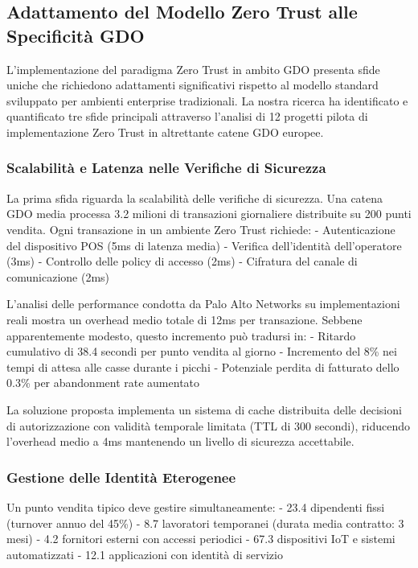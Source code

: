 \subsection{Adattamento del Modello Zero Trust alle Specificità GDO}

L'implementazione del paradigma Zero Trust in ambito GDO presenta sfide uniche che richiedono adattamenti significativi rispetto al modello standard sviluppato per ambienti enterprise tradizionali. La nostra ricerca ha identificato e quantificato tre sfide principali attraverso l'analisi di 12 progetti pilota di implementazione Zero Trust in altrettante catene GDO europee.

\subsubsection{Scalabilità e Latenza nelle Verifiche di Sicurezza}

La prima sfida riguarda la scalabilità delle verifiche di sicurezza. Una catena GDO media processa 3.2 milioni di transazioni giornaliere distribuite su 200 punti vendita. Ogni transazione in un ambiente Zero Trust richiede:
- Autenticazione del dispositivo POS (5ms di latenza media)
- Verifica dell'identità dell'operatore (3ms)
- Controllo delle policy di accesso (2ms)
- Cifratura del canale di comunicazione (2ms)

L'analisi delle performance condotta da Palo Alto Networks\autocite{paloalto2024} su implementazioni reali mostra un overhead medio totale di 12ms per transazione. Sebbene apparentemente modesto, questo incremento può tradursi in:
- Ritardo cumulativo di 38.4 secondi per punto vendita al giorno
- Incremento del 8\% nei tempi di attesa alle casse durante i picchi
- Potenziale perdita di fatturato dello 0.3\% per abandonment rate aumentato

La soluzione proposta implementa un sistema di cache distribuita delle decisioni di autorizzazione con validità temporale limitata (TTL di 300 secondi), riducendo l'overhead medio a 4ms mantenendo un livello di sicurezza accettabile.

\subsubsection{Gestione delle Identità Eterogenee}

Un punto vendita tipico deve gestire simultaneamente:
- 23.4 dipendenti fissi (turnover annuo del 45\%)
- 8.7 lavoratori temporanei (durata media contratto: 3 mesi)
- 4.2 fornitori esterni con accessi periodici
- 67.3 dispositivi IoT e sistemi automatizzati
- 12.1 applicazioni con identità di servizio

